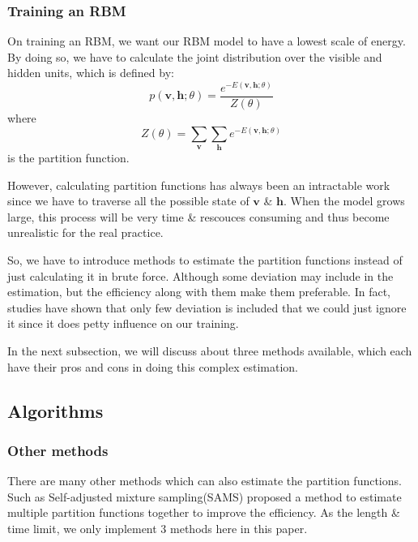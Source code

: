\subsubsection{Training an RBM}
On training an RBM, we want our RBM model to have a lowest scale of energy. By doing so, we have to calculate the joint distribution over the visible and hidden units, which is defined by:
\begin{equation}
	p(\mathbf v,\mathbf h;\theta)=\frac{e^{-E(\mathbf v,\mathbf h;\theta)}}{Z(\theta)}
\end{equation}
where
\begin{equation}
	Z(\theta)=\sum_{\mathbf v} \sum_{\mathbf h} e^{-E(\mathbf v,\mathbf h;\theta)}
\end{equation}
is the partition function.

However, calculating partition functions has always been an intractable work since we have to traverse all the possible state of $\mathbf v$ \& $\mathbf h$.
When the model grows large, this process will be very time \& rescouces consuming and thus become unrealistic for the real practice.

So, we have to introduce methods to estimate the partition functions instead of just calculating it in brute force. Although some deviation may include in the estimation, but the efficiency along with them make them preferable. In fact, studies have shown that only few deviation is included that we could just ignore it since it does petty influence on our training.

In the next subsection, we will discuss about three methods available, which each have their pros and cons in doing this complex estimation.



\subsection{Algorithms}





\subsubsection{Other methods}
There are many other methods which can also estimate the partition functions. Such as Self-adjusted mixture sampling(SAMS)\cite{tan2015optimally} proposed a method to estimate multiple partition functions together to improve the efficiency. As the length \& time limit, we only implement 3 methods here in this paper.














